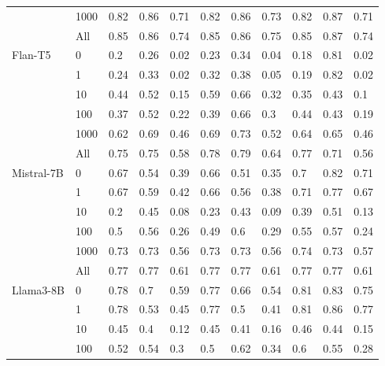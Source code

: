 \begin{table}
\begin{tabular}[t]{llll>{}l|ll>{}l|lll}
 & 1000 & 0.82 & 0.86 & 0.71 & 0.82 & 0.86 & 0.73 & 0.82 & 0.87 & 0.71\\

 & All & 0.85 & 0.86 & 0.74 & 0.85 & 0.86 & 0.75 & 0.85 & 0.87 & 0.74\\
\cmidrule{1-11}
Flan-T5 & 0 & 0.2 & 0.26 & 0.02 & 0.23 & 0.34 & 0.04 & 0.18 & 0.81 & 0.02\\

 & 1 & 0.24 & 0.33 & 0.02 & 0.32 & 0.38 & 0.05 & 0.19 & 0.82 & 0.02\\

 & 10 & 0.44 & 0.52 & 0.15 & 0.59 & 0.66 & 0.32 & 0.35 & 0.43 & 0.1\\

 & 100 & 0.37 & 0.52 & 0.22 & 0.39 & 0.66 & 0.3 & 0.44 & 0.43 & 0.19\\

 & 1000 & 0.62 & 0.69 & 0.46 & 0.69 & 0.73 & 0.52 & 0.64 & 0.65 & 0.46\\

 & All & 0.75 & 0.75 & 0.58 & 0.78 & 0.79 & 0.64 & 0.77 & 0.71 & 0.56\\
\cmidrule{1-11}
Mistral-7B & 0 & 0.67 & 0.54 & 0.39 & 0.66 & 0.51 & 0.35 & 0.7 & 0.82 & 0.71\\

 & 1 & 0.67 & 0.59 & 0.42 & 0.66 & 0.56 & 0.38 & 0.71 & 0.77 & 0.67\\

 & 10 & 0.2 & 0.45 & 0.08 & 0.23 & 0.43 & 0.09 & 0.39 & 0.51 & 0.13\\

 & 100 & 0.5 & 0.56 & 0.26 & 0.49 & 0.6 & 0.29 & 0.55 & 0.57 & 0.24\\

 & 1000 & 0.73 & 0.73 & 0.56 & 0.73 & 0.73 & 0.56 & 0.74 & 0.73 & 0.57\\

 & All & 0.77 & 0.77 & 0.61 & 0.77 & 0.77 & 0.61 & 0.77 & 0.77 & 0.61\\
\cmidrule{1-11}
Llama3-8B & 0 & 0.78 & 0.7 & 0.59 & 0.77 & 0.66 & 0.54 & 0.81 & 0.83 & 0.75\\

 & 1 & 0.78 & 0.53 & 0.45 & 0.77 & 0.5 & 0.41 & 0.81 & 0.86 & 0.77\\

 & 10 & 0.45 & 0.4 & 0.12 & 0.45 & 0.41 & 0.16 & 0.46 & 0.44 & 0.15\\

 & 100 & 0.52 & 0.54 & 0.3 & 0.5 & 0.62 & 0.34 & 0.6 & 0.55 & 0.28\\


\end{tabular}
\end{table}
